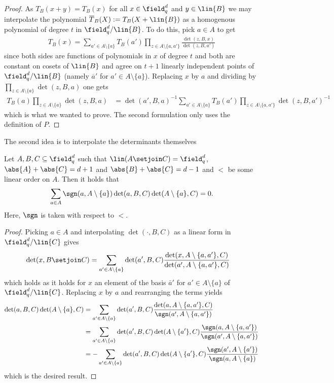 \message{ !name(OnTheRAIDProblem.tex)}\documentclass[8pt,a4paper]{article}
\begin{document}
\begin{proof}
As $T_B(x+y)=T_B(x)$ for all $x\in\field_q^d$ and $y\in\lin{B}$ we may
interpolate the polynomial $\overline{T}_B(X):=T_{B}(X+\lin{B})$ as a homogenous polynomial of
degree $t$ in $\field_q^d/\lin{B}$. To do this, pick $a\in A$ to get
\begin{align}
T_B(x)=\sum_{a'\in A\setminus\{a\}}{T_B(a')\prod_{z\in A\setminus\{a,a'\}}{\frac{\det(z,B,x)}{\det(z,B,a')}}}
\end{align}
since both sides are functions of polynomials in $x$ of degree $t$
and both are constant on cosets of $\lin{B}$ and agree on $t+1$
linearly independent points of $\field_q^d/\lin{B}$ (namely $\overline{a}'$
for $a'\in A\setminus\{a\}$). Replacing $x$ by $a$ and dividing by
$\prod_{z\in A\setminus\{a\}}{\det(z,B,a)}$ one gets 
\begin{align}
T_B(a)\prod_{z\in  A\setminus\{a\}}{\det(z,B,a)} 
 &= \det(a',B,a)^{-1}\sum_{a'\in A\setminus\{a\}}{T_B(a')\prod_{z\in A\setminus\{a,a'\}}{\det(z,B,a')^{-1}}}
\end{align}
which is what we wanted to prove.
The second formulation only uses the definition of $P$.
\end{proof}

The second idea is to interpolate the determinants themselves

\begin{lemma}
Let $A,B,C\subseteq \field_q^d$ such that $\lin(A\setjoin
C)=\field_q^d$, $\abs{A}+\abs{C}=d+1$ and $\abs{B}+\abs{C}=d-1$ and $<$
be some linear order on $A$. Then it holds that
\begin{align}
\sum_{a\in A}{\sgn(a,A\setminus\{a\})\det(a,B,C)\det(A\setminus\{a\},C)}=0\text{.}
\end{align}
Here, $\sgn$ is taken with respect to $<$.
\end{lemma}

\begin{proof}
Picking $a\in A$ and interpolating $\det(\cdot,B,C)$ as a linear form in
$\field_q^d/\lin{C}$ gives
\begin{align*}
\det(x,B\setjoin C) 
 &= \sum_{a'\in A\setminus\{a\}}{\det(a',B,C)\frac{\det(x,A\setminus\{a,a'\},C)}{\det(a',A\setminus\{a,a'\},C)}}
\end{align*}
which holds as it holds for $x$ an element of the basis $\bar{a}'$ for $a'\in
A\setminus\{a\}$ of $\field_q^d/\lin{C}$. Replacing $x$ by $a$ and
rearranging the terms yields
\begin{align*}
\det(a,B,C)\det(A\setminus\{a\},C)
 &= 
\sum_{a'\in A\setminus\{a\}}{\det(a',B,C)\frac{\det(a,A\setminus\{a,a'\},C)}{\sgn(a',A\setminus\{a,a'\})}}\\
 &= 
\sum_{a'\in A\setminus\{a\}}{\det(a',B,C)\det(A\setminus\{a'\},C)\frac{\sgn(a,A\setminus\{a,a'\})}{\sgn(a',A\setminus\{a,a'\})}}\\
 &= 
-\sum_{a'\in A\setminus\{a\}}{\det(a',B,C)\det(A\setminus\{a'\},C)\frac{\sgn(a',A\setminus\{a'\})}{\sgn(a,A\setminus\{a\})}}
\end{align*}
which is the desired result.
\end{proof}
\end{document}
